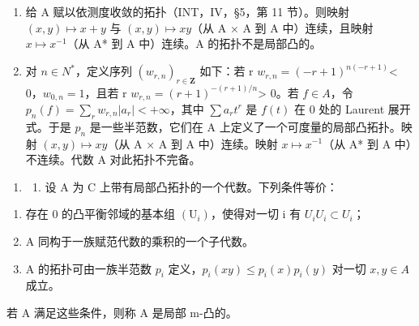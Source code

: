 \begin{enumerate}
\def\labelenumi{\alph{enumi})}
\item
  给 A 赋以依测度收敛的拓扑（INT，IV，§5，第 11 节）。则映射 \((x,y)\mapsto x+y\) 与 \((x,y)\mapsto xy\)（从 A × A 到 A 中）连续，且映射 \(x\mapsto x^{-1}\)（从 A* 到 A 中）连续。A 的拓扑不是局部凸的。
\item
  对 \(n \in N^{*}\)，定义序列 \((w_{r,n})_{r \in \mathbf{Z}}\) 如下：若 r \(w_{r,n} = (-r + 1)^{n(-r+1)}\)\textless{} 0，\(w_{0,n} = 1\)，且若 r \(w_{r,n} = (r + 1)^{-(r+1)/n}\)\textgreater{} 0。若 \(f \in A\)，令 \(p_n(f) = \sum_r w_{r,n} |a_r| < +\infty\)，其中 \(\sum a_r t^r\) 是 \(f(t)\) 在 0 处的 Laurent 展开式。于是 \(p_n\) 是一些半范数，它们在 A 上定义了一个可度量的局部凸拓扑。映射 \((x, y) \mapsto xy\)（从 A × A 到 A 中）连续。映射 \(x \mapsto x^{-1}\)（从 A* 到 A 中）不连续。代数 A 对此拓扑不完备。
\end{enumerate}

\begin{enumerate}
\def\labelenumi{\arabic{enumi})}
\setcounter{enumi}{36}
\tightlist
\item
  \begin{enumerate}
  \def\labelenumii{\alph{enumii})}
  \tightlist
  \item
    设 A 为 C 上带有局部凸拓扑的一个代数。下列条件等价：
  \end{enumerate}
\end{enumerate}

\begin{enumerate}
\def\labelenumi{(\roman{enumi})}
\item
  存在 0 的凸平衡邻域的基本组 \((\mathrm{U}_{i})\)，使得对一切 i 有 \(U_{i}U_{i} \subset U_{i}\)；
\item
  A 同构于一族赋范代数的乘积的一个子代数。
\item
  A 的拓扑可由一族半范数 \(p_{i}\) 定义，\(p_{i}(xy) \leqslant p_{i}(x)p_{i}(y)\) 对一切 \(x, y \in A\) 成立。
\end{enumerate}

若 A 满足这些条件，则称 A 是局部 m-凸的。

